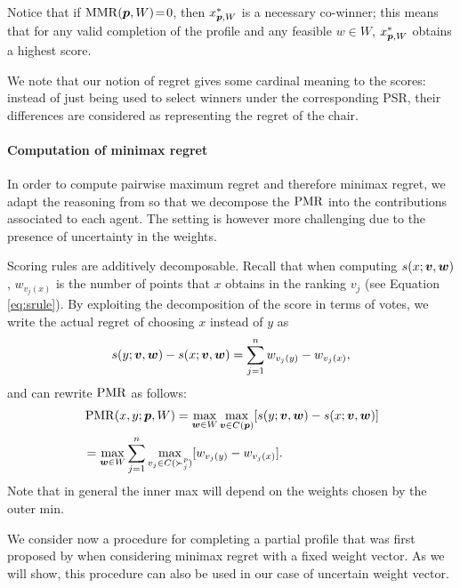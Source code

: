 Notice that if $\operatorname{MMR}({\bm{p}}, W)\!=\!0$, then $x^{*}_{{\bm{p}},W}$ is a necessary co-winner; this means that for any valid completion of the profile and any feasible $w \!\in\! W$, $x^{*}_{{\bm{p}},W}$ obtains a highest score.

We note that our notion of regret gives some cardinal meaning to the scores: instead of just being used to select winners under the corresponding PSR, their differences are considered as representing the regret of the chair.


\paragraph{Computation of minimax regret}
In order to compute pairwise maximum regret and therefore minimax regret, we adapt the reasoning from \citet{Lu2011} so that we decompose the $\operatorname{PMR}$ into the contributions associated to each agent.
The setting is however more challenging due to the presence of uncertainty in the weights.

Scoring rules are additively decomposable.
Recall that when computing $s(x; \bm{v}, \bm{w})$, $w_{v_j(x)}$ is the number of points that $x$ obtains in the ranking $v_j$ (see Equation \ref{eq:srule}).
By exploiting the decomposition of the score in terms of votes, we write the actual regret of choosing $x$ instead of $y$ as
\[
s(y; \bm{v},\bm{w}) - s(x; \bm{v}, \bm{w}) = \sum_{j=1}^n w_{v_j(y)} - w_{v_j(x)},
\]
and  can rewrite $\operatorname{PMR}$ as follows:
\begin{align*}
& \operatorname{PMR}(x,y; {\bm{p}}, W) = \max_{\bm{w} \in W} \max_{\bm{v} \in C({\bm{p}})} [ s(y; \bm{v},\bm{w}) - s(x; \bm{v},\bm{w}) ] \\
& =  \max_{\bm{w} \in W} \sum_{j=1}^{n} \max_{v_j \in C(\succ_j^p)} [w_{v_j(y)} - w_{v_j(x)}]. \\
\end{align*}
Note that in general the inner max will depend on the weights chosen by the outer min.

We consider now a procedure for completing a partial profile that was first proposed by \citet{Lu2011} when considering minimax regret with a fixed weight vector.
As we will show, this procedure can also be used in our case of uncertain weight vector.

